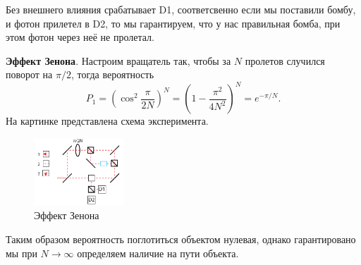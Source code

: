 Без внешнего влияния срабатывает D1, соответсвенно если мы поставили бомбу, и фотон прилетел в D2, то мы гарантируем, что у нас правильная бомба, при этом фотон через неё не пролетал. 


\textbf{Эффект Зенона}. Настроим вращатель так, чтобы за $N$ пролетов случился поворот на $\pi/2$, тогда вероятность
\begin{equation*}
	P_1 = \left(
		\cos^2 \frac{\pi}{2N}
	\right)^N = \left(1 - \frac{\pi^2}{4 N^2}\right)^N = e^{-\pi/N}.
\end{equation*}
На картинке представлена схема эксперимента. 
\begin{figure}[h]
    \centering
    \includegraphics[width=0.3\textwidth]{figures/2.pdf}
    \caption{Эффект Зенона}
\end{figure}
Таким образом вероятность поглотиться объектом нулевая, однако гарантировано мы при $N \to \infty$ определяем наличие на пути объекта. 